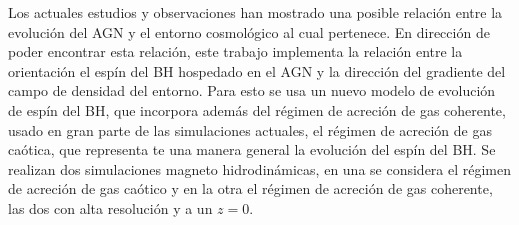 

\begin{abstracts}






Los actuales estudios y observaciones han mostrado una posible relación entre la evolución del AGN y el entorno cosmológico al cual pertenece. En dirección de poder encontrar esta relación, este trabajo implementa la relación entre la orientación el espín del BH  hospedado en el AGN y la dirección del gradiente del campo de densidad del entorno. Para esto se usa un nuevo modelo de evolución de espín del BH, que incorpora además del régimen de acreción de gas coherente, usado en gran parte de las simulaciones actuales, el régimen de acreción de gas caótica, que representa te una manera general la evolución del espín del BH. Se realizan dos simulaciones magneto hidrodinámicas, en una se considera el régimen de acreción de gas caótico y en la otra el régimen de acreción de gas coherente, las dos con alta resolución y a un  $z=0$. 


\end{abstracts}
